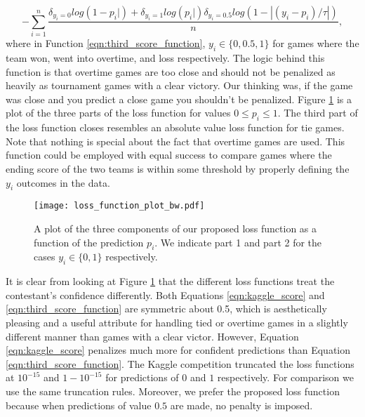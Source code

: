 \begin{equation}\label{eqn:third_score_function}
  -\sum_{i=1}^n\frac{\delta_{y_i=0}log(1-p_i|) + \delta_{y_i=1}log(p_i|) \delta_{y_i=0.5}log(1-|(y_i-p_i)/\tau|)}{n},
\end{equation} 
where in Function \ref{eqn:third_score_function}, $y_i \in \{0,0.5,1\}$ for games where the team won, went into overtime, and loss respectively. The logic behind this function is that overtime games are too close and should not be penalized as heavily as tournament games with a clear victory.
 Our thinking was, if the game was close and you predict a close game you shouldn't be penalized. Figure \ref{fig:scoring_functions} is a plot of the three parts of the loss function for values $0\leq p_i \leq 1$. The third part of the loss function closes resembles an absolute value loss function for tie games. Note that nothing is special about the fact that overtime games are used. This function could be employed with equal success to compare games where the ending score of the two teams is within some threshold by properly defining the $y_i$ outcomes in the data.   

\begin{figure}[H]
\centering
\texttt{[image: loss\_function\_plot\_bw.pdf]}
\caption{A plot of the three components of our proposed loss function as a function of the prediction $p_i$. We indicate part 1 and part 2 for the cases $y_i \in \{0,1\}$ respectively. }
\label{fig:scoring_functions}
\end{figure}

It is clear from looking at Figure \ref{fig:scoring_functions} that the different loss functions treat the contestant's confidence differently. Both Equations \ref{eqn:kaggle_score} and \ref{eqn:third_score_function} are symmetric about 0.5, which is aesthetically pleasing and a useful attribute for handling tied or overtime games in a slightly different manner than games with a clear victor. However, Equation \ref{eqn:kaggle_score} penalizes much more for confident predictions than Equation \ref{eqn:third_score_function}. The Kaggle competition truncated the loss functions at $10^{-15}$ and $1-10^{-15}$ for predictions of $0$ and $1$ respectively. For comparison we use the same truncation rules. Moreover, we prefer the proposed loss function because when predictions of value $0.5$ are made, no penalty is imposed. 

